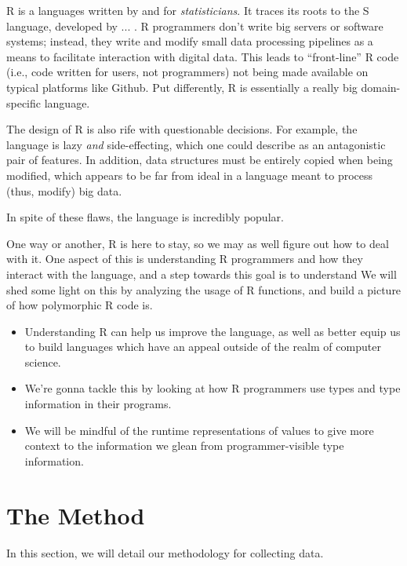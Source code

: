 R is a languages written by and for \textit{statisticians}.
It traces its roots to the S language, developed by ... .
R programmers don't write big servers or software systems; instead, they write and modify small data processing pipelines as a means to facilitate interaction with digital data.
This leads to ``front-line'' R code (i.e., code written for users, not programmers) not being made available on typical platforms like Github.
Put differently, R is essentially a really big domain-specific language.

The design of R is also rife with questionable decisions.
For example, the language is lazy \textit{and} side-effecting, which one could describe as an antagonistic pair of features.
In addition, data structures must be entirely copied when being modified, which appears to be far from ideal in a language meant to process (thus, modify) big data.

In spite of these flaws, the language is incredibly popular. 

One way or another, R is here to stay, so we may as well figure out how to deal with it.
One aspect of this is understanding R programmers and how they interact with the language, and a step towards this goal is to understand 
We will shed some light on this by analyzing the usage of R functions, and build a picture of how polymorphic R code is.

\begin{itemize}
    \item Understanding R can help us improve the language, as well as better equip us to build languages which have an appeal outside of the realm of computer science.
    \item We're gonna tackle this by looking at how R programmers use types and type information in their programs.
    \item We will be mindful of the runtime representations of values to give more context to the information we glean from programmer-visible type information.
\end{itemize}

%
%
%
%
%
%
\section{The Method}

In this section, we will detail our methodology for collecting data.

